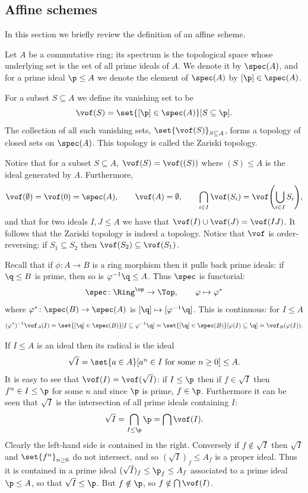 \subsection{Affine schemes}

In this section we briefly review the definition of an affine scheme.

\bdefn

    Let $A$ be a commutative ring; its {\emphcolor spectrum} is the topological space whose underlying set is the set of all prime ideals of $A$.
    We denote it by $\spec(A)$, and for a prime ideal $\p\leq A$ we denote the element of $\spec(A)$ by $[\p]\in\spec(A)$.

    For a subset $S\subseteq A$ we define its {\emphcolor vanishing set} to be
    $$ \vof(S) = \set{[\p]\in\spec(A)}[S\subseteq\p] . $$
    The collection of all such vanishing sets, $\set{\vof(S)}_{S\subseteq A}$, forms a topology of closed sets on $\spec(A)$.
    This topology is called the {\emphcolor Zariski topology}.

\edefn

Notice that for a subset $S\subseteq A$, $\vof(S)=\vof((S))$ where $(S)\leq A$ is the ideal generated by $A$.
Furthermore,
$$ \vof(\emptyset) = \vof(0) = \spec(A),\qquad \vof(A) = \emptyset,\qquad \bigcap_{i\in I}\vof(S_i) = \vof\parens{\bigcup_{i\in I}S_i} , $$
and that for two ideals $I,J\leq A$ we have that $\vof(I)\cup\vof(J)=\vof(IJ)$.
It follows that the Zariski topology is indeed a topology.
Notice that $\vof$ is order-reversing: if $S_1\subseteq S_2$ then $\vof(S_2)\subseteq\vof(S_1)$.

Recall that if $\phi\colon A\to B$ is a ring morphism then it pulls back prime ideals: if $\q\leq B$ is prime, then so is $\phi^{-1}\q\leq A$.
Thus $\spec$ is functorial:
$$ \spec\colon\Ring^\op\to\Top,\qquad \phi\mapsto\phi^* $$
where $\phi^*\colon\spec(B)\to\spec(A)$ is $[\q]\mapsto[\phi^{-1}\q]$.
This is continuous: for $I\leq A$
$$ (\phi^*)^{-1}\vof_A(I) = \set{[\q]\in\spec(B)}[I\subseteq\phi^{-1}\q] = \set{[\q]\in\spec(B)}[\phi(I)\subseteq\q] = \vof_B(\phi(I)) . $$

If $I\leq A$ is an ideal then its {\emphcolor radical} is the ideal
$$ \sqrt I = \set{a\in A}[\hbox{$a^n\in I$ for some $n\geq0$}] \leq A . $$
It is easy to see that $\vof(I)=\vof(\sqrt I)$: if $I\leq\p$ then if $f\in\sqrt I$ then $f^n\in I\leq\p$ for some $n$ and since $\p$ is prime, $f\in\p$.
Furthermore it can be seen that $\sqrt I$ is the intersection of all prime ideals containing $I$:
$$ \sqrt I = \bigcap_{I\leq\p}\p = \bigcap\vof(I) . $$
Clearly the left-hand side is contained in the right.
Conversely if $f\notin\sqrt I$ then $\sqrt I$ and $\set{f^n}_{n\geq0}$ do not intersect, and so $(\sqrt I)_f\leq A_f$ is a proper ideal.
Thus it is contained in a prime ideal $(\sqrt I)_f\leq\p_f\leq A_f$ associated to a prime ideal $\p\leq A$, so that $\sqrt I\leq\p$.
But $f\notin\p$, so $f\notin\bigcap\vof(I)$.

